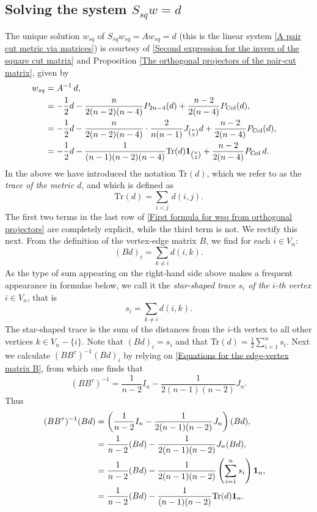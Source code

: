\documentclass[12pt]{amsart}
\numberwithin{theorem}{section}
\theoremstyle{remark}
\begin{document}
\subsection{Solving the system $S_{sq}w = d$}
The unique solution $w_{sq}$ of $S_{sq}w_{sq} = Aw_{sq} = d$ (this is the linear system \eqref{A pair cut metric via matrices}) is courtesy of \eqref{Second expression for the invers of the square cut matrix} and Proposition \ref{The orthogonal projectors of the pair-cut matrix}, given by 
\begin{align} \label{First formula for wsq from orthogonal projectors}
w_{sq} & = A^{-1}\,d, \cr 
& = -\frac{1}{2}d - \frac{n}{2(n-2)(n-4)}P_{2n-4}(d)  + \frac{n-2}{2(n-4)} P_{\text{Col}}(d), \cr
& = -\frac{1}{2}d - \frac{n}{2(n-2)(n-4)}\cdot \frac{2}{n(n-1)} J_{n\choose 2} d  + \frac{n-2}{2(n-4)} P_{\text{Col}}(d), \cr
 & = -\frac{1}{2}d - \frac{1}{(n-1)(n-2)(n-4)}\text{Tr}(d) \mathbf{1}_{n\choose 2}  + \frac{n-2}{2(n-4)} P_{\text{Col}}\, d.
\end{align}
In the above we have introduced the notation Tr$(d)$, which we refer to as the {\em trace of the metric $d$}, and which is defined as 
\begin{equation} \label{Definition of the trace of a metric}
\text{Tr}(d) = \sum_{i<j} \, d(i,j).
\end{equation}
The first two terms in the last row of \eqref{First formula for wsq from orthogonal projectors} are completely explicit, while the third term is not. We rectify this next. From the definition of the vertex-edge matrix $B$, we find for each $i\in V_n$: 
$$(Bd)_i  = \sum_{k\ne i} d(i,k).  $$
As the type of sum appearing on the right-hand side above makes a frequent appearance in formulae below, we call it the {\em star-shaped trace $s_i$ of the $i$-th vertex $i\in V_n$}, that is  
\begin{equation} \label{Definition of the star-shaped trace of the i-th vertex}
s_i = \sum_{k\ne i} d(i,k).
\end{equation} 
The star-shaped trace is the sum of the distances from the $i$-th vertex to all other vertices $k\in V_n-\{i\}$. Note that $(Bd)_i = s_i$ and that Tr$(d) =\frac{1}{2} \sum _{i=1}^n s_i$. Next we calculate $(BB^\tau)^{-1}(Bd)_i$ by relying on \eqref{Equations for the edge-vertex matrix B}, from which one finds that 
$$(BB^\tau)^{-1} =  \frac{1}{n-2}I_n - \frac{1}{2(n-1)(n-2)} J_n.$$
Thus
\begin{align*}
(BB^\tau)^{-1}(Bd) & =  \left( \frac{1}{n-2}I_n - \frac{1}{2(n-1)(n-2)} J_n\right)(Bd), \cr 
& = \frac{1}{n-2}(Bd) - \frac{1}{2(n-1)(n-2)} J_n (Bd),  \cr
& = \frac{1}{n-2}(Bd)  - \frac{1}{2(n-1)(n-2)} \left( \sum_{i=1}^n s_i\right)  \mathbf{1}_n,  \cr
& = \frac{1}{n-2}(Bd)  - \frac{1}{(n-1)(n-2)} \text{Tr}(d) \mathbf{1}_n.  \cr
\end{align*}
\end{document}
